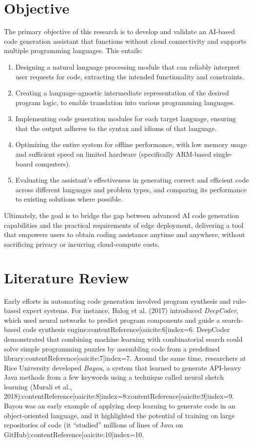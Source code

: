 \documentclass[12pt]{article}
\begin{document}
\section{Objective}
\noindent 
The primary objective of this research is to develop and validate an AI-based code generation assistant that functions without cloud connectivity and supports multiple programming languages. This entails:
\begin{enumerate}
    \item Designing a natural language processing module that can reliably interpret user requests for code, extracting the intended functionality and constraints.
    \item Creating a language-agnostic intermediate representation of the desired program logic, to enable translation into various programming languages.
    \item Implementing code generation modules for each target language, ensuring that the output adheres to the syntax and idioms of that language.
    \item Optimizing the entire system for offline performance, with low memory usage and sufficient speed on limited hardware (specifically ARM-based single-board computers).
    \item Evaluating the assistant’s effectiveness in generating correct and efficient code across different languages and problem types, and comparing its performance to existing solutions where possible.
\end{enumerate}
Ultimately, the goal is to bridge the gap between advanced AI code generation capabilities and the practical requirements of edge deployment, delivering a tool that empowers users to obtain coding assistance anytime and anywhere, without sacrificing privacy or incurring cloud-compute costs.

\section{Literature Review}
\noindent 
Early efforts in automating code generation involved program synthesis and rule-based expert systems. For instance, Balog et al. (2017) introduced \textit{DeepCoder}, which used neural networks to predict program components and guide a search-based code synthesis engine:contentReference[oaicite:6]{index=6}. DeepCoder demonstrated that combining machine learning with combinatorial search could solve simple programming puzzles by assembling code from a predefined library:contentReference[oaicite:7]{index=7}. Around the same time, researchers at Rice University developed \textit{Bayou}, a system that learned to generate API-heavy Java methods from a few keywords using a technique called neural sketch learning (Murali et al., 2018):contentReference[oaicite:8]{index=8}:contentReference[oaicite:9]{index=9}. Bayou was an early example of applying deep learning to generate code in an object-oriented language, and it highlighted the potential of training on large repositories of code (it “studied” millions of lines of Java on GitHub):contentReference[oaicite:10]{index=10}.
\end{document}
